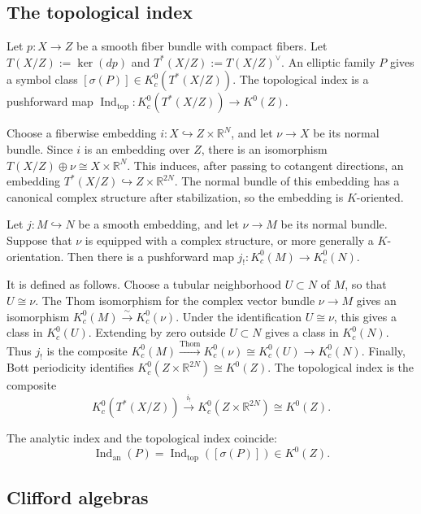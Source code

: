\documentclass[12pt]{article}
\begin{document}
\subsection{The topological index}

Let \(p:X\to Z\) be a smooth fiber bundle with compact fibers. Let \(T(X/Z):=\ker(dp)\) and \(T^*(X/Z):=T(X/Z)^\vee\). An elliptic family \(P\) gives a symbol class \([\sigma(P)]\in K_c^0(T^*(X/Z))\). The topological index is a pushforward map \(\operatorname{Ind}_{\mathrm{top}}:K_c^0(T^*(X/Z))\to K^0(Z)\).

Choose a fiberwise embedding \(i:X\hookrightarrow Z\times \mathbb R^N\), and let \(\nu\to X\) be its normal bundle. Since \(i\) is an embedding over \(Z\), there is an isomorphism \(T(X/Z)\oplus \nu\cong X\times \mathbb R^N\). This induces, after passing to cotangent directions, an embedding \(T^*(X/Z)\hookrightarrow Z\times \mathbb R^{2N}\). The normal bundle of this embedding has a canonical complex structure after stabilization, so the embedding is \(K\)-oriented.

\begin{theorem}
Let \(j:M\hookrightarrow N\) be a smooth embedding, and let \(\nu\to M\) be its normal bundle. Suppose that \(\nu\) is equipped with a complex structure, or more generally a \(K\)-orientation. Then there is a pushforward map \(j_!:K_c^0(M)\to K_c^0(N)\).
\end{theorem}

It is defined as follows. Choose a tubular neighborhood \(U\subset N\) of \(M\), so that \(U\cong \nu\). The Thom isomorphism for the complex vector bundle \(\nu\to M\) gives an isomorphism \(K_c^0(M)\xrightarrow{\sim}K_c^0(\nu)\). Under the identification \(U\cong \nu\), this gives a class in \(K_c^0(U)\). Extending by zero outside \(U\subset N\) gives a class in \(K_c^0(N)\). Thus \(j_!\) is the composite \(K_c^0(M)\xrightarrow{\mathrm{Thom}}K_c^0(\nu)\cong K_c^0(U)\to K_c^0(N)\).
Finally, Bott periodicity identifies \(K_c^0(Z\times \mathbb R^{2N})\cong K^0(Z)\). The topological index is the composite
\[
K_c^0(T^*(X/Z))
\xrightarrow{i_!}
K_c^0(Z\times \mathbb R^{2N})
\cong K^0(Z).
\]

\begin{theorem}
The analytic index and the topological index coincide:
\[
\operatorname{Ind}_{\mathrm{an}}(P)=\operatorname{Ind}_{\mathrm{top}}([\sigma(P)])\in K^0(Z).
\]
\end{theorem}

\subsection{Clifford algebras}
\end{document}
